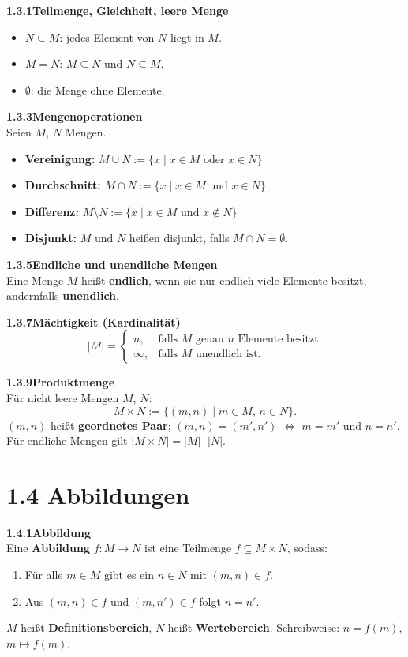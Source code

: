 \documentclass[a4paper,12pt]{article}
\newcommand{\gentry}[3]{%
  \noindent\textbf{#1\quad #2}\nopagebreak\\[0.2em]
  #3\par\smallskip
}
\begin{document}
\gentry{1.3.1}{Teilmenge, Gleichheit, leere Menge}{%
  \begin{itemize}[topsep=2pt,itemsep=1pt]
    \item $N \subseteq M$: jedes Element von $N$ liegt in $M$.
    \item $M = N$: $M \subseteq N$ und $N \subseteq M$.
    \item $\emptyset$: die Menge ohne Elemente.
  \end{itemize}
}

\gentry{1.3.3}{Mengenoperationen}{%
  Seien $M$, $N$ Mengen.
  \begin{itemize}[topsep=2pt,itemsep=1pt]
    \item \textbf{Vereinigung:} $M \cup N := \{x \mid x \in M \text{ oder } x \in N\}$
    \item \textbf{Durchschnitt:} $M \cap N := \{x \mid x \in M \text{ und } x \in N\}$
    \item \textbf{Differenz:} $M \setminus N := \{x \mid x \in M \text{ und } x \notin N\}$
    \item \textbf{Disjunkt:} $M$ und $N$ heißen disjunkt, falls $M \cap N = \emptyset$.
  \end{itemize}
}

\gentry{1.3.5}{Endliche und unendliche Mengen}{%
  Eine Menge $M$ heißt \textbf{endlich}, wenn sie nur endlich viele Elemente
  besitzt, andernfalls \textbf{unendlich}.
}

\gentry{1.3.7}{Mächtigkeit (Kardinalität)}{%
  \[
    |M| =
    \begin{cases}
      n, & \text{falls } M \text{ genau } n \text{ Elemente besitzt} \\
      \infty, & \text{falls } M \text{ unendlich ist.}
    \end{cases}
  \]
}

\gentry{1.3.9}{Produktmenge}{%
  Für nicht leere Mengen $M$, $N$:
  \[
    M \times N := \{(m,n) \mid m \in M,\, n \in N\}.
  \]
  $(m,n)$ heißt \textbf{geordnetes Paar}; $(m,n) = (m',n')$
  $\Leftrightarrow$ $m = m'$ und $n = n'$.
  Für endliche Mengen gilt $|M \times N| = |M| \cdot |N|$.
}

\section*{1.4 \quad Abbildungen}

\gentry{1.4.1}{Abbildung}{%
  Eine \textbf{Abbildung} $f: M \to N$ ist eine Teilmenge
  $f \subseteq M \times N$, sodass:
  \begin{enumerate}[label=(\roman*),topsep=2pt,itemsep=1pt]
    \item Für alle $m \in M$ gibt es ein $n \in N$ mit $(m,n) \in f$.
    \item Aus $(m,n) \in f$ und $(m,n') \in f$ folgt $n = n'$.
  \end{enumerate}
  $M$ heißt \textbf{Definitionsbereich}, $N$ heißt \textbf{Wertebereich}.
  Schreibweise: $n = f(m)$, \;$m \mapsto f(m)$.
}
\end{document}
